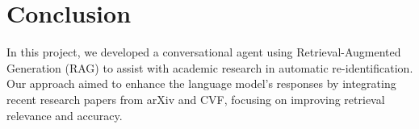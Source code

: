 \documentclass[fleqn,moreauthors,10pt]{ds_report}
\begin{document}
\section*{Conclusion}
In this project, we developed a conversational agent using Retrieval-Augmented Generation (RAG) to assist with academic research in automatic re-identification. Our approach aimed to enhance the language model's responses by integrating recent research papers from arXiv and CVF, focusing on improving retrieval relevance and accuracy. 





\end{document}
